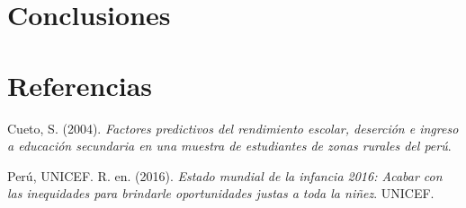 \documentclass[
]{article}
\newlength{\cslhangindent}
\newenvironment{CSLReferences}[2] %
 {\begin{list}{}{%
  \setlength{\itemindent}{0pt}
  \setlength{\leftmargin}{0pt}
  \setlength{\parsep}{0pt}
  \ifodd #1
   \setlength{\leftmargin}{\cslhangindent}
   \setlength{\itemindent}{-1\cslhangindent}
  \fi
  \setlength{\itemsep}{#2\baselineskip}}}
 {\end{list}}
\begin{document}
\section*{Conclusiones}\label{conclusiones}

\newpage

\section*{Referencias}\label{referencias}

\label{refs}
\begin{CSLReferences}{1}{0}
Cueto, S. (2004). \emph{Factores predictivos del rendimiento escolar,
deserci{ó}n e ingreso a educaci{ó}n secundaria en una muestra de
estudiantes de zonas rurales del per{ú}}.

Perú, UNICEF. R. en. (2016). \emph{Estado mundial de la infancia 2016:
Acabar con las inequidades para brindarle oportunidades justas a toda la
niñez}. UNICEF.

\end{CSLReferences}
\end{document}

